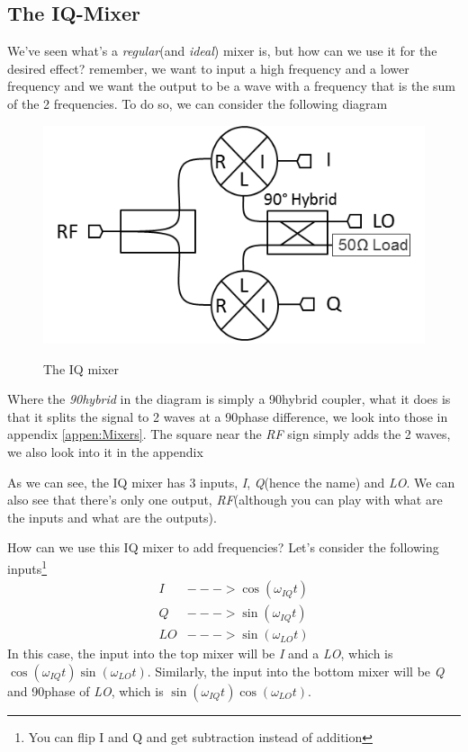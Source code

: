 \documentclass[english, a4paper, 12pt, twoside]{article}
\numberwithin{equation}{section} %
\begin{document}
\subsection{The IQ-Mixer}
We've seen what's a \textit{regular}(and \textit{ideal}) mixer is, but how can we use it for the desired effect? remember, we want to input a high frequency and a lower frequency and we want the output to be a wave with a frequency that is the sum of the 2 frequencies. To do so, we can consider the following diagram
\begin{figure}[H]
    \centering
    \caption{The IQ mixer}
    \includegraphics[width=0.5\columnwidth]{IQ-Mixer.png} %
    \label{fig:IQ-Mixer}
\end{figure}
Where the \textit{90\degree hybrid} in the diagram is simply a 90\degree hybrid coupler, what it does is that it splits the signal to 2 waves at a 90\degree phase difference, we look into those in appendix \ref{appen:Mixers}. The square near the \textit{RF} sign simply adds the 2 waves, we also look into it in the appendix %

As we can see, the IQ mixer has 3 inputs, \textit{I}, \textit{Q}(hence the name) and \textit{LO}. We can also see that there's only one output, \textit{RF}(although you can play with what are the inputs and what are the outputs).

How can we use this IQ mixer to add frequencies? Let's consider the following inputs\footnote{You can flip I and Q and get subtraction instead of addition}
\begin{align*}
    I &---> \cos(\omega_{IQ} t)\\
    Q &---> \sin(\omega_{IQ} t)\\
    LO &---> \sin(\omega_{LO}t)
\end{align*}
In this case, the input into the top mixer will be \textit{I} and a \textit{LO}, which is $\cos(\omega_{IQ}t)\sin(\omega_{LO}t)$. Similarly, the input into the bottom mixer will be \textit{Q} and 90\degree phase of \textit{LO}, which is $\sin(\omega_{IQ}t)\cos(\omega_{LO}t)$.
\end{document}
